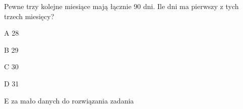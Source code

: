 \begin{tresc}
Pewne trzy kolejne miesiące mają łącznie 90 dni. Ile dni ma pierwszy z tych trzech miesięcy?
\end{tresc}
\begin{wariant}{A} 28 \end{wariant}
\begin{wariant}{B} 29 \end{wariant}
\begin{wariant}{C} 30 \end{wariant}
\begin{wariant}{D} 31 \end{wariant}
\begin{wariant}{E} za mało danych do rozwiązania zadania \end{wariant}
